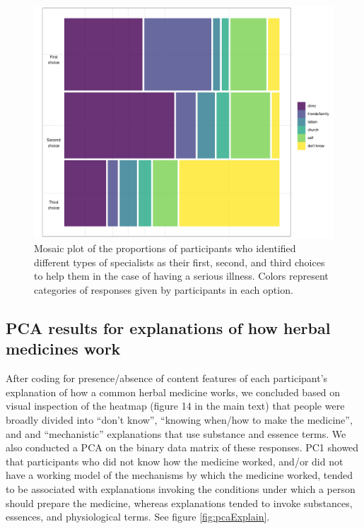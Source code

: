 \documentclass[
]{article}
\begin{document}
\begin{figure}[p]

{\centering \includegraphics{supplementary_files/figure-latex/fieldplotillness-1} 

}

\caption{Mosaic plot of the proportions of participants who identified different types of specialists as their first, second, and third choices to help them in the case of having a serious illness. Colors represent categories of responses given by participants in each option.}\label{fig:fieldplotillness}
\end{figure}

\hypertarget{pca-results-for-explanations-of-how-herbal-medicines-work}{%
\subsection{PCA results for explanations of how herbal medicines work}\label{pca-results-for-explanations-of-how-herbal-medicines-work}}

After coding for presence/absence of content features of each participant's explanation of how a common herbal medicine works, we concluded based on visual inspection of the heatmap (figure 14 in the main text) that people were broadly divided into ``don't know'', ``knowing when/how to make the medicine'', and and ``mechanistic'' explanations that use substance and essence terms. We also conducted a PCA on the binary data matrix of these responses. PC1 showed that participants who did not know how the medicine worked, and/or did not have a working model of the mechanisms by which the medicine worked, tended to be associated with explanations invoking the conditions under which a person should prepare the medicine, whereas explanations tended to invoke substances, essences, and physiological terms. See figure \ref{fig:pcaExplain}.
\end{document}
